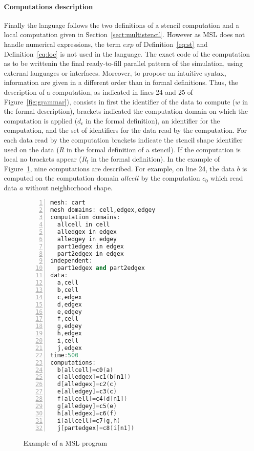 \paragraph{Computations description} Finally the language follows the two definitions of a stencil computation and a local computation given in Section~\ref{sect:multistencil}. However as MSL does not handle numerical expressions, the term $exp$ of Definition~\ref{eq:st} and Definition~\ref{eq:loc} is not used in the language. The exact code of the computation as to be writtenin the final ready-to-fill parallel pattern of the simulation, using external languages or interfaces. Moreover, to propose an intuitive syntax, information are given in a different order than in formal definitions.
Thus, the description of a computation, as indicated in lines 24 and 25 of Figure~\ref{fig:grammar}), consists in first the identifier of the data to compute ($w$ in the formal description), brackets indicated the computation domain on which the computation is applied ($d_c$ in the formal definition), an identifier for the computation, and the set of identifiers for the data read by the computation. For each data read by the computation brackets indicate the stencil shape identifier used on the data ($R$ in the formal definition of a stencil). If the computation is local no brackets appear ($R_l$ in the formal definition). In the example of Figure~\ref{fig:mslex}, nine computations are described. For example, on line 24, the data $b$ is computed on the computation domain $allcell$ by the computation $c_0$ which read data $a$ without neighborhood shape.
\begin{figure}
\begin{lstlisting}[basicstyle=\small,mathescape,frame=single,language=C++,numbers=left]
mesh: cart
mesh domains: cell,edgex,edgey
computation domains:
  allcell in cell
  alledgex in edgex
  alledgey in edgey
  part1edgex in edgex
  part2edgex in edgex
independent:
  part1edgex and part2edgex
data:
  a,cell
  b,cell
  c,edgex
  d,edgex
  e,edgey
  f,cell
  g,edgey
  h,edgex
  i,cell
  j,edgex
time:500
computations:
  b[allcell]=c0(a)
  c[alledgex]=c1(b[n1])
  d[alledgex]=c2(c)
  e[alledgey]=c3(c)
  f[allcell]=c4(d[n1])
  g[alledgey]=c5(e)
  h[alledgex]=c6(f)
  i[allcell]=c7(g,h)
  j[partedgex]=c8(i[n1])
\end{lstlisting}
\caption{Example of a MSL program}
\label{fig:mslex}
\end{figure}

